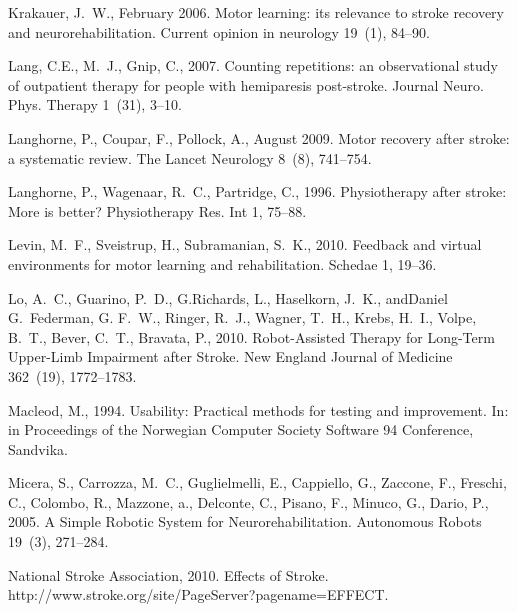 \documentclass[preprint,authoryear,12pt]{elsarticle}
\begin{document}
\begin{thebibliography}{40}
Krakauer, J.~W., February 2006. Motor learning: its relevance to stroke
  recovery and neurorehabilitation. Current opinion in neurology 19~(1),
  84--90.

Lang, C.E., M.~J., Gnip, C., 2007. {Counting repetitions: an observational
  study of outpatient therapy for people with hemiparesis post-stroke.} Journal
  Neuro. Phys. Therapy 1~(31), 3--10.

Langhorne, P., Coupar, F., Pollock, A., August 2009. Motor recovery after
  stroke: a systematic review. The Lancet Neurology 8~(8), 741--754.

Langhorne, P., Wagenaar, R.~C., Partridge, C., 1996. {Physiotherapy after
  stroke: More is better?} Physiotherapy Res. Int 1, 75--88.

Levin, M.~F., Sveistrup, H., Subramanian, S.~K., 2010. Feedback and virtual
  environments for motor learning and rehabilitation. Schedae 1, 19--36.

Lo, A.~C., Guarino, P.~D., G.Richards, L., Haselkorn, J.~K., andDaniel
  G.~Federman, G. F.~W., Ringer, R.~J., Wagner, T.~H., Krebs, H.~I., Volpe,
  B.~T., Bever, C.~T., Bravata, P., 2010. {Robot-Assisted Therapy for Long-Term
  Upper-Limb Impairment after Stroke}. New England Journal of Medicine
  362~(19), 1772--1783.

Macleod, M., 1994. Usability: Practical methods for testing and improvement.
  In: in Proceedings of the Norwegian Computer Society Software 94 Conference,
  Sandvika.

Micera, S., Carrozza, M.~C., Guglielmelli, E., Cappiello, G., Zaccone, F.,
  Freschi, C., Colombo, R., Mazzone, a., Delconte, C., Pisano, F., Minuco, G.,
  Dario, P., 2005. {A Simple Robotic System for Neurorehabilitation}.
  Autonomous Robots 19~(3), 271--284.

{National Stroke Association}, 2010. {Effects of Stroke}.
  {http://www.stroke.org/site/PageServer?pagename=EFFECT}.


\end{thebibliography}
\end{document}
